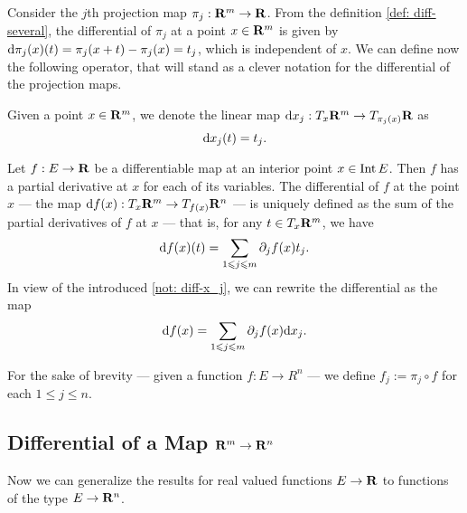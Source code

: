 Consider the \(j\)th projection map \(\pi_j: \mathbf{R}^m \to \mathbf{R}\). From the definition
\cref{def: diff-several}, the differential of \(\pi_j\) at a point \(x \in
\mathbf{R}^m\) is given by \(\mathrm{d} \pi_j(x)(t) = \pi_j(x + t) - \pi_j(x) = t_j\), which
is independent of \(x\). We can define now the following operator, that will
stand as a clever notation for the differential of the projection maps.

\begin{notation}\label{not: diff-x_j}
  Given a point \(x \in \mathbf{R}^m\), we denote the linear map \(\mathrm{d} x_j: T_x\mathbf{R}^m
  \to T_{\pi_j(x)}\mathbf{R}\) as
  \[
    \mathrm{d} x_j(t) = t_j.
  \]
\end{notation}

\begin{proposition}\label{prop: differential}
  Let \(f: E \to \mathbf{R}\) be a differentiable map at an interior point \(x \in \operatorname{Int}
  E\). Then \(f\) has a partial derivative at \(x\) for each of its variables.
  The differential of \(f\) at the point \(x\) --- the map \(\mathrm{d} f(x): T_x\mathbf{R}^m
  \to T_{f(x)}\mathbf{R}^n\) --- is uniquely defined as the sum of the partial
  derivatives of \(f\) at \(x\) --- that is, for any \(t \in T_x\mathbf{R}^m\), we have
  \[
    \mathrm{d} f(x)(t) = \sum_{1 \leqslant j \leqslant m} \partial_j f(x) t_j.
  \]
  In view of the introduced \cref{not: diff-x_j}, we can rewrite the
  differential as the map
  \[
    \mathrm{d} f(x) = \sum_{1 \leqslant j \leqslant m} \partial_j f(x) \mathrm{d} x_j.
  \]
\end{proposition}

\begin{notation}
  For the sake of brevity --- given a function \(f: E \to R^n\) --- we define
  \(f_j := \pi_j \circ f\) for each \(1 \leq j \leq n\).
\end{notation}

\subsection{Differential of a Map \texorpdfstring{\(\mathbf{R}^m \to \mathbf{R}^n\)}{Rm to Rn}}

Now we can generalize the results for real valued functions \(E \to \mathbf{R}\) to
functions of the type \(E \to \mathbf{R}^n\).

